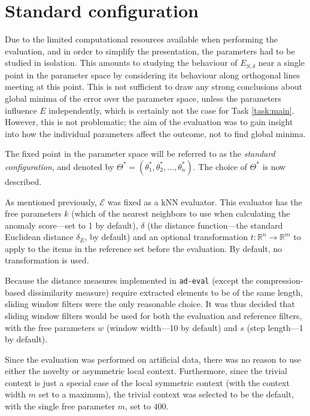 \section{Standard configuration}
\label{sect:standard_config}

Due to the limited computational resources available when performing the evaluation, and in order to simplify the presentation, the parameters had to be studied in isolation. This amounts to studying the behaviour of $E_{S, \delta}$ near a single point in the parameter space by considering its behaviour along orthogonal lines meeting at this point. This is not sufficient to draw any strong conclusions about global minima of the error over the parameter space, unless the parameters influence $E$ independently, which is certainly not the case for Task \ref{task:main}. However, this is not problematic; the aim of the evaluation was to gain insight into how the individual parameters affect the outcome, not to find global minima. 

The fixed point in the parameter space will be referred to as the \emph{standard configuration}, and denoted by $\Theta^* = (\theta_1^*, \theta_2^*, \dots, \theta_n^*)$. The choice of $\Theta^*$ is now described.

As mentioned previously, $\mathcal{E}$ was fixed as a kNN evaluator. This evaluator has the free parameters $k$ (which of the nearest neighbors to use when calculating the anomaly score---set to 1 by default), $\delta$ (the distance function---the standard Euclidean distance $\delta_E$, by default) and an optional transformation $t: \mathbb{R}^n \rightarrow \mathbb{R}^m$ to apply to the items in the reference set before the evaluation. By default, no transformation is used.

Because the distance measures implemented in \texttt{ad-eval} (except the compression-based dissimilarity measure) require extracted elements to be of the same length, sliding window filters were the only reasonable choice. It was thus decided that sliding window filters would be used for both the evaluation and reference filters, with the free parameters $w$ (window width---10 by default) and $s$ (step length---1 by default).

Since the evaluation was performed on artificial data, there was no reason to use either the novelty or asymmetric local context. Furthermore, since the trivial context is just a special case of the local symmetric context (with the context width $m$ set to a maximum), the trivial context was selected to be the default, with the single free parameter $m$, set to $400$.

